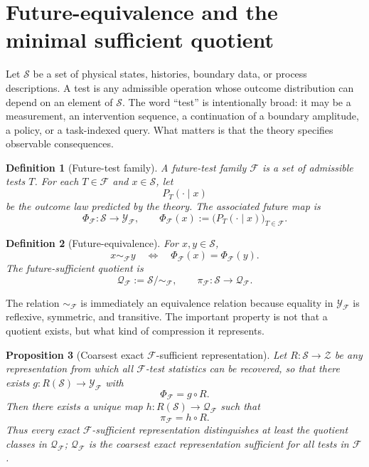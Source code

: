 \documentclass[11pt]{article}
\newtheorem{definition}{Definition}
\newtheorem{proposition}[definition]{Proposition}
\newcommand{\F}{\mathcal F}
\newcommand{\Sspace}{\mathcal S}
\newcommand{\Y}{\mathcal Y}
\newcommand{\Q}{\mathcal Q}
\begin{document}
\section{Future-equivalence and the minimal sufficient quotient}
\label{sec:quotient}

Let $\Sspace$ be a set of physical states, histories, boundary data, or process descriptions. A test is any admissible operation whose outcome distribution can depend on an element of $\Sspace$. The word ``test'' is intentionally broad: it may be a measurement, an intervention sequence, a continuation of a boundary amplitude, a policy, or a task-indexed query. What matters is that the theory specifies observable consequences.

\begin{definition}[Future-test family]
A future-test family $\F$ is a set of admissible tests $T$. For each $T\in\F$ and $x\in\Sspace$, let
\begin{equation}
   P_T(\cdot\mid x)
\end{equation}
be the outcome law predicted by the theory. The associated future map is
\begin{equation}
  \Phi_{\F}:\Sspace\longrightarrow\Y_{\F},
  \qquad
  \Phi_{\F}(x):=\bigl(P_T(\cdot\mid x)\bigr)_{T\in\F}.
  \label{eq:future-map}
\end{equation}
\end{definition}

\begin{definition}[Future-equivalence]
For $x,y\in\Sspace$,
\begin{equation}
  x\sim_{\F}y
  \quad\Longleftrightarrow\quad
  \Phi_{\F}(x)=\Phi_{\F}(y).
  \label{eq:future-equivalence}
\end{equation}
The future-sufficient quotient is
\begin{equation}
  \Q_{\F}:=\Sspace/\!\sim_{\F},
  \qquad
  \pi_{\F}:\Sspace\to\Q_{\F}.
  \label{eq:quotient}
\end{equation}
\end{definition}

The relation $\sim_{\F}$ is immediately an equivalence relation because equality in $\Y_{\F}$ is reflexive, symmetric, and transitive. The important property is not that a quotient exists, but what kind of compression it represents.

\begin{proposition}[Coarsest exact $\F$-sufficient representation]
\label{prop:coarsest}
Let $R:\Sspace\to\mathcal Z$ be any representation from which all $\F$-test statistics can be recovered, so that there exists $g:R(\Sspace)\to\Y_{\F}$ with
\begin{equation}
   \Phi_{\F}=g\circ R.
   \label{eq:sufficient-map}
\end{equation}
Then there exists a unique map $h:R(\Sspace)\to\Q_{\F}$ such that
\begin{equation}
  \pi_{\F}=h\circ R.
  \label{eq:factor-through}
\end{equation}
Thus every exact $\F$-sufficient representation distinguishes at least the quotient classes in $\Q_{\F}$; $\Q_{\F}$ is the coarsest exact representation sufficient for all tests in $\F$.
\end{proposition}
\end{document}
